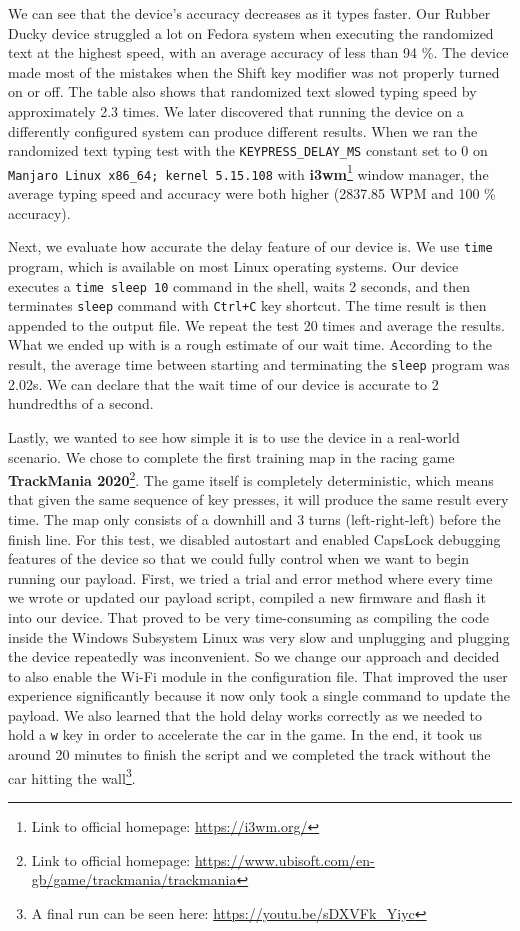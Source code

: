 We can see that the device's accuracy decreases as it types faster. Our Rubber Ducky device struggled a lot on Fedora system when executing the randomized text at the highest speed, with an average accuracy of less than 94 \%. The device made most of the mistakes when the Shift key modifier was not properly turned on or off. The table also shows that randomized text slowed typing speed by approximately 2.3 times. We later discovered that running the device on a differently configured system can produce different results. When we ran the randomized text typing test with the \verb|KEYPRESS_DELAY_MS| constant set to 0 on \verb|Manjaro Linux x86_64; kernel 5.15.108| with \textbf{i3wm}\footnote{Link to official homepage: \url{https://i3wm.org/}} window manager, the average typing speed and accuracy were both higher (2837.85 WPM and 100 \% accuracy).

Next, we evaluate how accurate the delay feature of our device is. We use \verb|time| program, which is available on most Linux operating systems. Our device executes a \verb|time sleep 10| command in the shell, waits 2 seconds, and then terminates \verb|sleep| command with \verb|Ctrl+C| key shortcut. The time result is then appended to the output file. We repeat the test 20 times and average the results. What we ended up with is a rough estimate of our wait time. According to the result, the average time between starting and terminating the \verb|sleep| program was 2.02s. We can declare that the wait time of our device is accurate to 2 hundredths of a second.

Lastly, we wanted to see how simple it is to use the device in a real-world scenario. We chose to complete the first training map in the racing game \textbf{TrackMania 2020}\footnote{Link to official homepage: \url{https://www.ubisoft.com/en-gb/game/trackmania/trackmania}}. The game itself is completely deterministic, which means that given the same sequence of key presses, it will produce the same result every time. The map only consists of a downhill and 3 turns (left-right-left) before the finish line. For this test, we disabled autostart and enabled CapsLock debugging features of the device so that we could fully control when we want to begin running our payload. First, we tried a trial and error method where every time we wrote or updated our payload script, compiled a new firmware and flash it into our device. That proved to be very time-consuming as compiling the code inside the Windows Subsystem Linux was very slow and unplugging and plugging the device repeatedly was inconvenient. So we change our approach and decided to also enable the Wi-Fi module in the configuration file. That improved the user experience significantly because it now only took a single command to update the payload. We also learned that the hold delay works correctly as we needed to hold a \verb|w| key in order to accelerate the car in the game. In the end, it took us around 20 minutes to finish the script and we completed the track without the car hitting the wall\footnote{A final run can be seen here: \url{https://youtu.be/sDXVFk_Yiyc}}.

